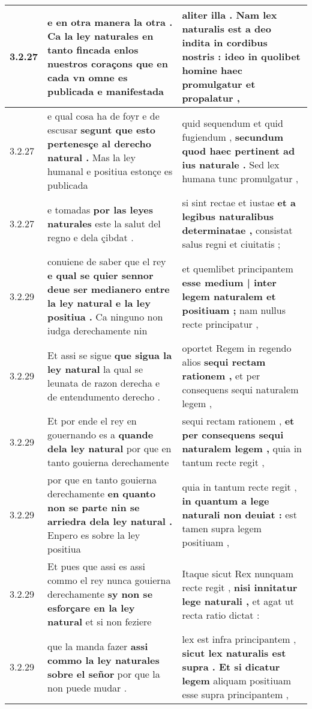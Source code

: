 \begin{tabular}{|p{1cm}|p{6.5cm}|p{6.5cm}|}
3.2.27 & e en otra manera la otra . \textbf{ Ca la ley naturales en tanto fincada enlos nuestros coraçons } que en cada vn omne es publicada e manifestada & aliter illa . \textbf{ Nam lex naturalis est a deo indita in cordibus nostris : } ideo in quolibet homine haec promulgatur et propalatur , \\\hline
3.2.27 & e qual cosa ha de foyr e de escusar \textbf{ segunt que esto pertenesçe al derecho natural . } Mas la ley humanal e positiua estonçe es publicada & quid sequendum et quid fugiendum , \textbf{ secundum quod haec pertinent ad ius naturale . } Sed lex humana tunc promulgatur , \\\hline
3.2.27 & e tomadas \textbf{ por las leyes naturales } este la salut del regno e dela çibdat . & si sint rectae et iustae \textbf{ et a legibus naturalibus determinatae , } consistat salus regni et ciuitatis ; \\\hline
3.2.29 & conuiene de saber que el rey \textbf{ e qual se quier sennor deue ser medianero entre la ley natural e la ley positiua . } Ca ninguno non iudga derechamente nin & et quemlibet principantem \textbf{ esse medium | inter legem naturalem et positiuam ; } nam nullus recte principatur , \\\hline
3.2.29 & Et assi se sigue \textbf{ que sigua la ley natural } la qual se leunata de razon derecha e de entendumento derecho . & oportet Regem in regendo alios \textbf{ sequi rectam rationem , } et per consequens sequi naturalem legem , \\\hline
3.2.29 & Et por ende el rey en gouernando es a \textbf{ quande dela ley natural } por que en tanto gouierna derechamente & sequi rectam rationem , \textbf{ et per consequens sequi naturalem legem , } quia in tantum recte regit , \\\hline
3.2.29 & por que en tanto gouierna derechamente \textbf{ en quanto non se parte nin se arriedra dela ley natural . } Enpero es sobre la ley positiua & quia in tantum recte regit , \textbf{ in quantum a lege naturali non deuiat : } est tamen supra legem positiuam , \\\hline
3.2.29 & Et pues que assi es assi commo el rey nunca gouierna derechamente \textbf{ sy non se esforçare en la ley natural } et si non feziere & Itaque sicut Rex nunquam recte regit , \textbf{ nisi innitatur lege naturali , } et agat ut recta ratio dictat : \\\hline
3.2.29 & que la manda fazer \textbf{ assi commo la ley naturales sobre el señor } por que la non puede mudar . & lex est infra principantem , \textbf{ sicut lex naturalis est supra . Et si dicatur legem } aliquam positiuam esse supra principantem , \\\hline

\end{tabular}
